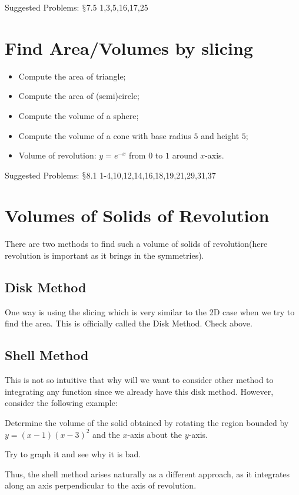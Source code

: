 \documentclass[12pt]{article}
\theoremstyle{definition}
\theoremstyle{definition}
\theoremstyle{remark}
\theoremstyle{definition}
\theoremstyle{definition}
\theoremstyle{definition}
\begin{document}
Suggested Problems: $\mathsection$7.5	1,3,5,16,17,25



\section{Find Area/Volumes by slicing}
\begin{itemize}
	\item Compute the area of triangle;
	\item Compute the area of (semi)circle;
	\item Compute the volume of a sphere; 
	\item Compute the volume of a cone with base radius $5$ and height $5$; 
	\item Volume of revolution: $y = e^{-x}$ from $0$ to $1$ around $x$-axis.
\end{itemize}

Suggested Problems: $\mathsection$8.1	1-4,10,12,14,16,18,19,21,29,31,37

\section{Volumes of Solids of Revolution}
There are two methods to find such a volume of solids of revolution(here revolution is important as it brings in the symmetries).
\subsection{Disk Method}

 One way is using the slicing which is very similar to the 2D case when we try to find the area. This is officially called the Disk Method.
Check above.

\subsection{Shell Method}

This is not so intuitive that why will we want to consider other method to integrating any function since we already have this disk method. However, consider the following example:

Determine the volume of the solid obtained by rotating the region bounded by $y=(x-1)(x-3)^2$ and the $x$-axis about the $y$-axis.

Try to graph it and see why it is bad.

Thus, the shell method arises naturally as a different approach, as it integrates along an axis perpendicular to the axis of revolution.
\end{document}
